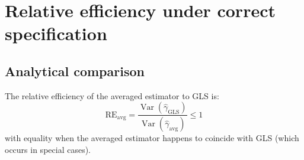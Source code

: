 \documentclass[
  11pt,
]{article}
\begin{document}
\section{Relative efficiency under correct
specification}\label{relative-efficiency-under-correct-specification}

\subsection{Analytical comparison}\label{analytical-comparison}

The relative efficiency of the averaged estimator to GLS is:
\begin{equation}
  \text{RE}_{\text{avg}} =
    \frac{\mathop{\mathrm{Var}}(\hat\gamma_{\text{GLS}})}
         {\mathop{\mathrm{Var}}(\hat\gamma_{\text{avg}})}
    \le 1
\end{equation} with equality when the averaged estimator happens to
coincide with GLS (which occurs in special cases).
\end{document}

